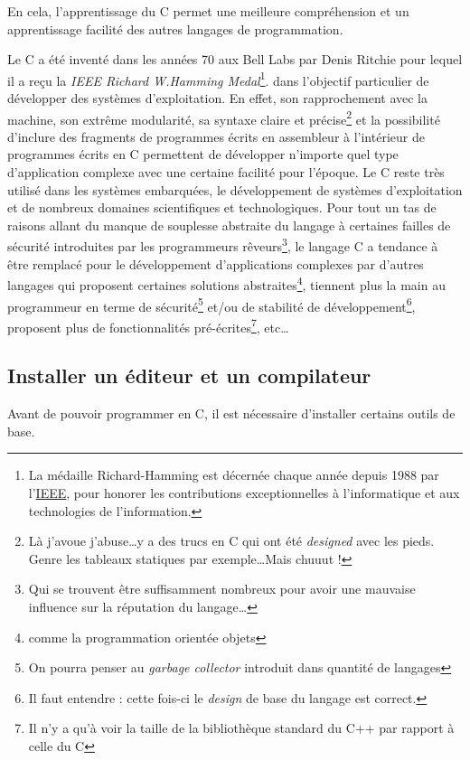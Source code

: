 \documentclass[../../main.tex]{subfiles}
\begin{document}
En cela, l'apprentissage du C permet une meilleure compréhension et un apprentissage facilité des autres langages de programmation.

Le C a été inventé dans les années 70 aux Bell Labs par Denis Ritchie pour lequel il a reçu la \textit{IEEE Richard W.Hamming Medal}\footnote{La médaille Richard-Hamming est décernée chaque année depuis 1988 par l'\href{https://fr.wikipedia.org/wiki/Institute_of_Electrical_and_Electronics_Engineers}{IEEE}, pour honorer les contributions exceptionnelles à l'informatique et aux technologies de l'information.}. dans l'objectif particulier de développer des systèmes d'exploitation. En effet, son rapprochement avec la machine, son extrême modularité, sa syntaxe claire et précise\footnote{Là j'avoue j'abuse\dots y a des trucs en C qui ont été \textit{designed} avec les pieds. Genre les tableaux statiques par exemple\dots Mais chuuut !} et la possibilité d'inclure des fragments de programmes écrits en assembleur à l'intérieur de programmes écrits en C permettent de développer n'importe quel type d'application complexe avec une certaine facilité pour l'époque. Le C reste très utilisé dans les systèmes embarquées, le développement de systèmes d'exploitation et de nombreux domaines scientifiques et technologiques. Pour tout un tas de raisons allant du manque de souplesse abstraite du langage à certaines failles de sécurité introduites par les programmeurs rêveurs\footnote{Qui se trouvent être suffisamment nombreux pour avoir une mauvaise influence sur la réputation du langage\dots}, le langage C a tendance à être remplacé pour le développement d'applications complexes par d'autres langages qui proposent certaines solutions abstraites\footnote{comme la programmation orientée objets}, tiennent plus la main au programmeur en terme de sécurité\footnote{On pourra penser au \textit{garbage collector} introduit dans quantité de langages} et/ou de stabilité de développement\footnote{Il faut entendre : cette fois-ci le \textit{design} de base du langage est correct.}, proposent plus de fonctionnalités pré-écrites\footnote{Il n'y a qu'à voir la taille de la bibliothèque standard du C++ par rapport à celle du C}, etc\dots
\subsection{Installer un éditeur et un compilateur}
Avant de pouvoir programmer en C, il est nécessaire d'installer certains outils de base.
\end{document}
